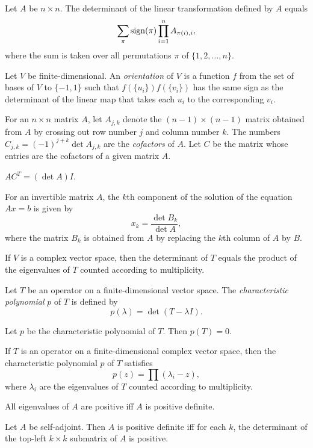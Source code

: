 \begin{prop}
  Let $A$ be $n\times n$. The determinant of the linear transformation defined
  by $A$ equals
  \[\sum_\pi\mathrm{sign}(\pi)\prod_{i=1}^n A_{\pi(i),i},\] 
  where the sum is taken over all permutations $\pi$ of $\{1,2,\ldots,n\}$.
\end{prop}
\begin{defn}
    Let $V$ be finite-dimensional. An \emph{orientation} of $V$ is a function
    $f$ from the set of bases of $V$ to $\{-1,1\}$ such that
    $f(\{u_i\})f(\{v_i\})$ has the same sign as the determinant of the
    linear map that takes each $u_i$ to the corresponding $v_i$.
\end{defn}
\begin{defn}
  For an $n\times n$ matrix $A$, let $A_{j,k}$ denote the $(n-1)\times(n-1)$
  matrix obtained from $A$ by crossing out row number $j$ and column number $k$.
  The numbers $C_{j,k}=(-1)^{j+k}\det A_{j,k}$ are the \emph{cofactors} of $A$.
  Let $C$ be the matrix whose entries are the cofactors of a given matrix $A$.
\end{defn}
\begin{thm}
  $AC^T=(\det A)I$.
\end{thm}
\begin{cor}
  For an invertible matrix $A$, the $k$th component of the solution of the
  equation $Ax=b$ is given by
  \[x_k=\frac{\det B_k}{\det A},\]
  where the matrix $B_k$ is obtained from $A$ by replacing the $k$th column of
  $A$ by $B$.
\end{cor}
\begin{prop}
  If $V$ is a complex vector space, then the determinant of $T$ equals the product of the
  eigenvalues of $T$ counted according to multiplicity.
\end{prop}
\begin{defn}
  Let $T$ be an operator on a finite-dimensional vector space. The
  \emph{characteristic polynomial} $p$ of $T$ is defined by
  \[p(\lambda)=\det(T-\lambda I).\]
\end{defn}
\begin{thm}
  Let $p$ be the characteristic polynomial of $T$. Then $p(T)=0$.
\end{thm}
\begin{prop}
  If $T$ is an operator on a finite-dimensional complex vector space, then the
  characteristic polynomial $p$ of $T$ satisfies
  \[p(z)=\prod(\lambda_i-z),\]
  where $\lambda_i$ are the eigenvalues of $T$ counted according to
  multiplicity.
\end{prop}
\begin{cor}
  All eigenvalues of $A$ are positive iff $A$ is positive definite.
\end{cor}
\begin{prop}
  Let $A$ be self-adjoint. Then $A$ is positive definite iff 
    for each $k$, the determinant of the top-left $k\times k$ submatrix of
      $A$ is positive.
\end{prop}
